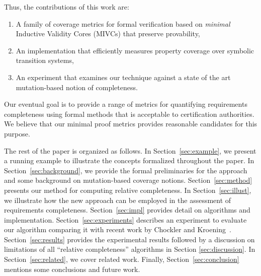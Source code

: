Thus, the contributions of this work are:
\begin{enumerate}
\item A family of coverage metrics for formal verification based on \emph{minimal} Inductive Validity Cores (MIVCs) that preserve provability,
\item An implementation that efficiently measures property coverage over symbolic transition systems,
\item An experiment that examines our technique against a state of the art mutation-based notion of completeness.
\end{enumerate}

\noindent Our eventual goal is to provide a range of metrics for quantifying requirements completeness using formal methods that is acceptable to certification authorities.  We believe that our minimal proof metrics provides reasonable candidates for this purpose.


The rest of the paper is organized as follows.  In Section~\ref{sec:example}, we present a running example to illustrate the concepts formalized throughout the paper.  In Section~\ref{sec:background}, we provide the formal preliminaries for the approach and some background on mutation-based coverage notions.  Section~\ref{sec:method} presents our method for computing relative completeness.
In Section~\ref{sec:illust}, we illustrate how the new approach can be employed in the assessment of requirements completeness.
Section~\ref{sec:impl} provides detail on algorithms and implementation. Section~\ref{sec:experiments} describes an experiment to evaluate our algorithm comparing it with recent work by Chockler and Kroening~\cite{chockler2010coverage}.
Section~\ref{sec:results} provides the experimental results followed by a discussion on limitations of all ``relative completeness'' algorithms in Section \ref{sec:discussion}.  In Section~\ref{sec:related}, we cover related work.  Finally, Section~\ref{sec:conclusion} mentions some conclusions and future work.

